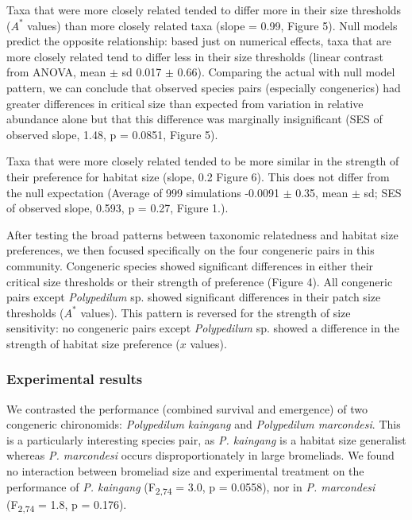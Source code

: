 Taxa that were more closely related tended to differ more in their size
thresholds (\(A^{*}\) values) than more closely related taxa (slope =
0.99, Figure 5). Null models predict the opposite relationship: based
just on numerical effects, taxa that are more closely related tend to
differ less in their size thresholds (linear contrast from ANOVA, mean $\pm$
sd 0.017 $\pm$ 0.66). Comparing the actual with null model pattern, we can
conclude that observed species pairs (especially congenerics) had
greater differences in critical size than expected from variation in
relative abundance alone but that this difference was marginally
insignificant (SES of observed slope, 1.48, p = 0.0851, Figure 5).

Taxa that were more closely related tended to be more similar in the
strength of their preference for habitat size (slope, 0.2 Figure 6).
This does not differ from the null expectation (Average of 999
simulations -0.0091 $\pm$ 0.35, mean $\pm$ sd; SES of observed slope, 0.593, p =
0.27, Figure 1.).

After testing the broad patterns between taxonomic relatedness and
habitat size preferences, we then focused specifically on the four
congeneric pairs in this community. Congeneric species showed
significant differences in either their critical size thresholds or
their strength of preference (Figure 4). All congeneric pairs except
\emph{Polypedilum} sp. showed significant differences in their patch
size thresholds (\(A^{*}\) values). This pattern is reversed for the
strength of size sensitivity: no congeneric pairs except
\emph{Polypedilum} sp. showed a difference in the strength of habitat
size preference (\(x\) values).

\subsubsection{Experimental results}\label{experimental-results}

We contrasted the performance (combined survival and emergence) of two
congeneric chironomids: \emph{Polypedilum kaingang} and
\emph{Polypedilum marcondesi}. This is a particularly interesting
species pair, as \emph{P. kaingang} is a habitat size generalist whereas
\emph{P. marcondesi} occurs disproportionately in large bromeliads. We
found no interaction between bromeliad size and experimental treatment
on the performance of \emph{P. kaingang} (F\textsubscript{2,74} = 3.0, p
= 0.0558), nor in \emph{P. marcondesi} (F\textsubscript{2,74} = 1.8, p =
0.176).

